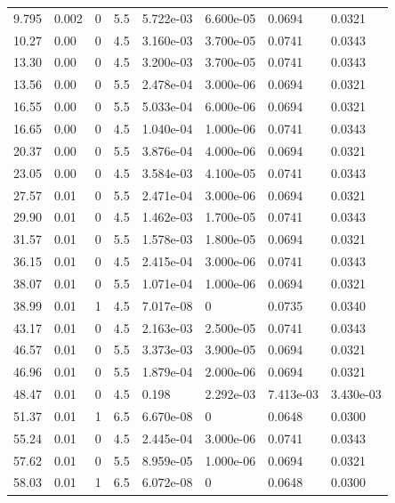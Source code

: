 \documentclass[preview]{standalone}
\begin{document}
{{\begin{tabular}{L{1.2cm}C{1.2cm} C{0.3cm}C{0.5cm} C{1.4cm}C{1.4cm} C{1.4cm}C{1.4cm}}
  9.795  &  0.002  & 0     & 5.5 &  5.722e-03  & 6.600e-05  & 0.0694 &  0.0321   \\ 
  10.27  &  0.00  & 0     & 4.5 &  3.160e-03  & 3.700e-05  & 0.0741 &  0.0343   \\ 
  13.30  &  0.00  & 0     & 4.5 &  3.200e-03  & 3.700e-05  & 0.0741 &  0.0343   \\ 
  13.56  &  0.00  & 0     & 5.5 &  2.478e-04  & 3.000e-06  & 0.0694 &  0.0321   \\ 
  16.55  &  0.00  & 0     & 5.5 &  5.033e-04  & 6.000e-06  & 0.0694 &  0.0321   \\ 
  16.65  &  0.00  & 0     & 4.5 &  1.040e-04  & 1.000e-06  & 0.0741 &  0.0343   \\ 
  20.37  &  0.00  & 0     & 5.5 &  3.876e-04  & 4.000e-06  & 0.0694 &  0.0321   \\ 
  23.05  &  0.00  & 0     & 4.5 &  3.584e-03  & 4.100e-05  & 0.0741 &  0.0343   \\ 
  27.57  &  0.01  & 0     & 5.5 &  2.471e-04  & 3.000e-06  & 0.0694 &  0.0321   \\ 
  29.90  &  0.01  & 0     & 4.5 &  1.462e-03  & 1.700e-05  & 0.0741 &  0.0343   \\ 
  31.57  &  0.01  & 0     & 5.5 &  1.578e-03  & 1.800e-05  & 0.0694 &  0.0321   \\ 
  36.15  &  0.01  & 0     & 4.5 &  2.415e-04  & 3.000e-06  & 0.0741 &  0.0343   \\ 
  38.07  &  0.01  & 0     & 5.5 &  1.071e-04  & 1.000e-06  & 0.0694 &  0.0321   \\ 
  38.99  &  0.01  & 1     & 4.5 &  7.017e-08  & 0  & 0.0735 &  0.0340   \\ 
  43.17  &  0.01  & 0     & 4.5 &  2.163e-03  & 2.500e-05  & 0.0741 &  0.0343   \\ 
  46.57  &  0.01  & 0     & 5.5 &  3.373e-03  & 3.900e-05  & 0.0694 &  0.0321   \\ 
  46.96  &  0.01  & 0     & 5.5 &  1.879e-04  & 2.000e-06  & 0.0694 &  0.0321   \\ 
  48.47  &  0.01  & 0     & 4.5 &  0.198  & 2.292e-03  & 7.413e-03 &  3.430e-03   \\ 
  51.37  &  0.01  & 1     & 6.5 &  6.670e-08  & 0  & 0.0648 &  0.0300   \\ 
  55.24  &  0.01  & 0     & 4.5 &  2.445e-04  & 3.000e-06  & 0.0741 &  0.0343   \\ 
  57.62  &  0.01  & 0     & 5.5 &  8.959e-05  & 1.000e-06  & 0.0694 &  0.0321   \\ 
  58.03  &  0.01  & 1     & 6.5 &  6.072e-08  & 0  & 0.0648 &  0.0300   \\ 

\end{tabular}}}
\end{document}
